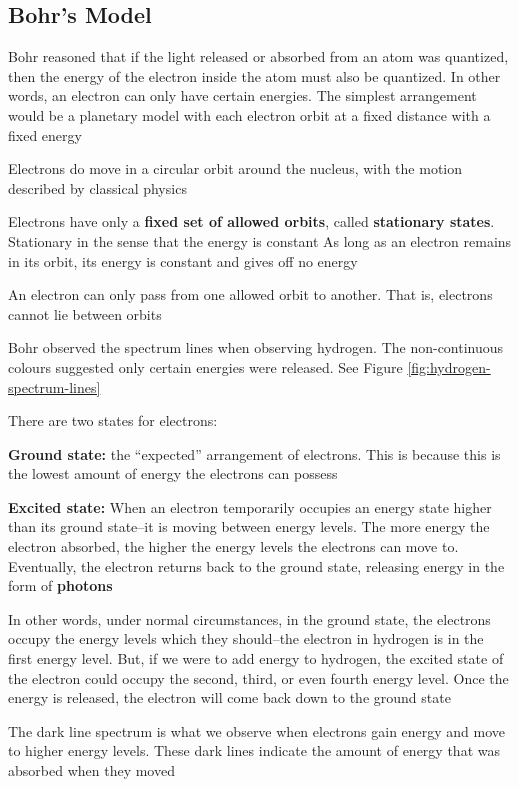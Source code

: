 \subsection{Bohr's Model}
\begin{bulleted-list}
    \item Bohr reasoned that if the light released or absorbed from an atom was quantized, then the
        energy of the electron inside the atom must also be quantized. In other words, an electron
        can only have certain energies. The simplest arrangement would be a planetary model with
        each electron orbit at a fixed distance with a fixed energy
    \item Electrons do move in a circular orbit around the nucleus, with the motion described
        by classical physics
    \item Electrons have only a \textbf{fixed set of allowed orbits}, called \textbf{stationary states}.
        Stationary in the sense that the energy is constant
        As long as an electron remains in its orbit, its energy is constant and gives off no energy
    \item An electron can only pass from one allowed orbit to another. That is, electrons cannot
        lie between orbits
    \item Bohr observed the spectrum lines when observing hydrogen. The non-continuous
        colours suggested only certain energies were released. See Figure \ref{fig:hydrogen-spectrum-lines}
    \item There are two states for electrons:
        \begin{enum}
            \item \textbf{Ground state:} the ``expected'' arrangement of electrons. This is because
                this is the lowest amount of energy the electrons can possess
            \item \textbf{Excited state:} When an electron temporarily occupies an energy state higher
                than its ground state--it is moving between energy levels. The more energy the 
                electron absorbed, the higher the energy levels the electrons can move to.
                Eventually, the electron returns back to the ground state, releasing energy
                in the form of \textbf{photons}
            \item In other words, under normal circumstances, in the ground state, the electrons
                occupy the energy levels which they should--the electron in hydrogen is in the first
                energy level. But, if we were to add energy to hydrogen, the excited state of
                the electron could occupy the second, third, or even fourth energy level. Once
                the energy is released, the electron will come back down to the ground state
            \item The dark line spectrum is what we observe when electrons gain energy and move
                to higher energy levels. These dark lines indicate the amount of energy that was
                absorbed when they moved
        \end{enum}
\end{bulleted-list}

